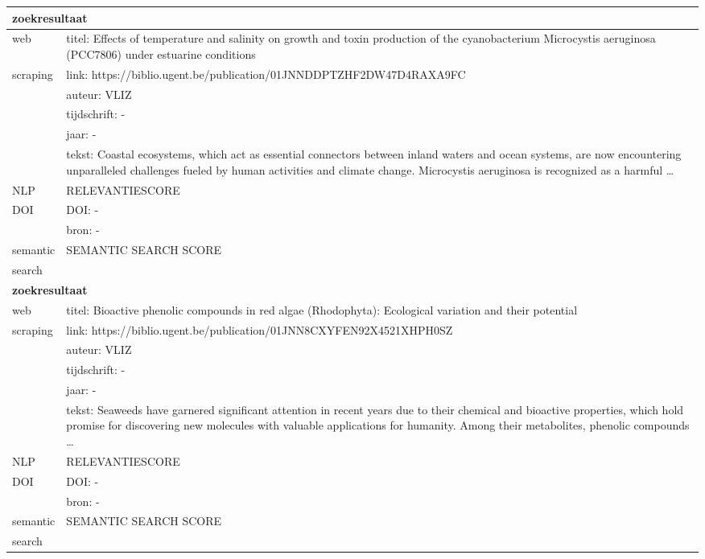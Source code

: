 \begin{table}[h!]
\begin{tabularx}{\textwidth}{|p{4cm}|X|}
        \hline
        \multicolumn{2}{|X|}{\textbf{zoekresultaat}} \\
        \hline
        web &titel: Effects of temperature and salinity on growth and toxin production of the cyanobacterium Microcystis aeruginosa (PCC7806) under estuarine conditions\\
        scraping&link: https://biblio.ugent.be/publication/01JNNDDPTZHF2DW47D4RAXA9FC\\
        &auteur: VLIZ\\
        &tijdschrift: -\\
        &jaar: -\\
        &tekst: Coastal ecosystems, which act as essential connectors between inland waters and ocean systems, are now encountering unparalleled challenges fueled by human activities and climate change. Microcystis aeruginosa is recognized as a harmful …\\
        \hline
        NLP&RELEVANTIESCORE\\
        \hline
        DOI&DOI: -\\
        &bron: -\\
        \hline
        semantic&SEMANTIC SEARCH SCORE\\
        search&\\
        \hline
        \multicolumn{2}{|X|}{\textbf{zoekresultaat}} \\
        \hline
        web &titel: Bioactive phenolic compounds in red algae (Rhodophyta): Ecological variation and their potential\\
        scraping&link: https://biblio.ugent.be/publication/01JNN8CXYFEN92X4521XHPH0SZ\\
        &auteur: VLIZ\\
        &tijdschrift: -\\
        &jaar: -\\
        &tekst: Seaweeds have garnered significant attention in recent years due to their chemical and bioactive properties, which hold promise for discovering new molecules with valuable applications for humanity. Among their metabolites, phenolic compounds …\\
        \hline
        NLP&RELEVANTIESCORE\\
        \hline
        DOI&DOI: -\\
        &bron: -\\
        \hline
        semantic&SEMANTIC SEARCH SCORE\\
        search&\\
        \hline
    \end{tabularx}
    \label{table:email20250308}
\end{table}
